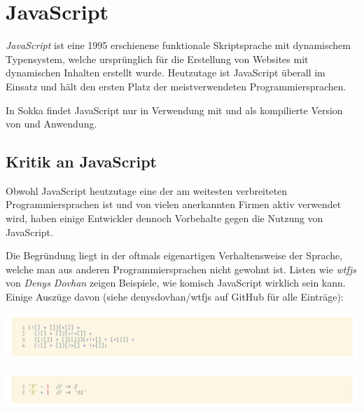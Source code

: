 \section{JavaScript}
\label{javascript}

\textit{JavaScript} ist eine 1995 erschienene funktionale Skriptsprache mit dynamischem Typensystem, welche ursprünglich für die Erstellung von Websites mit dynamischen Inhalten erstellt wurde. Heutzutage ist JavaScript überall im Einsatz und hält den ersten Platz der meistverwendeten Programmiersprachen. \cite{technostacks2021}

In Sokka findet JavaScript nur in Verwendung mit  und als kompilierte Version von  und  Anwendung.

\subsection{Kritik an JavaScript}

Obwohl JavaScript heutzutage eine der am weitesten verbreiteten Programmiersprachen ist und von vielen anerkannten Firmen aktiv verwendet wird, haben einige Entwickler dennoch Vorbehalte gegen die Nutzung von JavaScript.~\cite{keenetheng2016}

Die Begründung liegt in der oftmals eigenartigen Verhaltensweise der Sprache, welche man aus anderen Programmiersprachen nicht gewohnt ist. Listen wie \textit{wtfjs} von \textit{Denys Dovhan} zeigen Beispiele, wie komisch JavaScript wirklich sein kann. Einige Auszüge davon (siehe denysdovhan/wtfjs auf GitHub für alle Einträge): 

\begin{code}[htp]
    \begin{center}
        \includegraphics[width=1\textwidth]{images/JavaScript/fail.png}
        \vspace{-25pt}
        \caption{\glqq fail\grqq\space in JavaScript; diese Art von JavaScript ist auch bekannt als \textit{JSFuck}}
    \end{center}
\end{code}

\begin{code}[htp]
    \begin{center}
        \includegraphics[width=1\textwidth]{images/JavaScript/coercing.png}
        \vspace{-25pt}
        \caption{Lustige Mathematik: Die Typenumwandlung (Coercing) in JavaScript ...}
    \end{center}
\end{code}